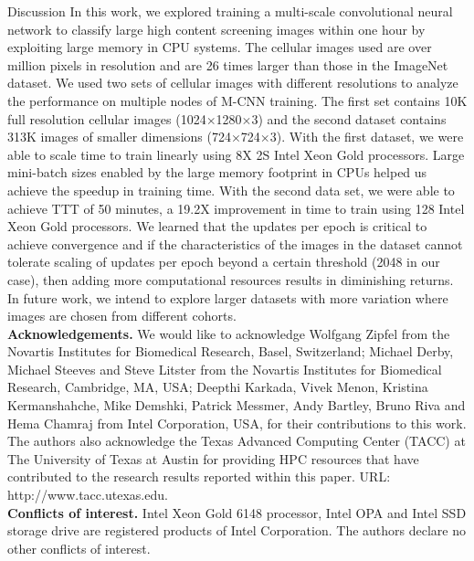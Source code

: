 \begin{section}{Discussion} \label{sec:discussion}
	\noindent  In this work, we explored training a multi-scale convolutional neural network to classify large high content screening images within one hour by exploiting large memory in CPU systems. The cellular images used are over million pixels in resolution and are 26 times larger than those in the ImageNet dataset. We used two sets of cellular images with different resolutions to analyze the performance on multiple nodes of M-CNN training. The first set contains 10K full resolution cellular images (1024$\times$1280$\times$3) and the second dataset contains 313K images of smaller dimensions (724$\times$724$\times$3). With the first dataset, we were able to scale time to train linearly using 8X 2S Intel\textregistered{} Xeon\textregistered{} Gold processors. Large mini-batch sizes enabled by the large memory footprint in CPUs helped us achieve the speedup in training time. With the second data set, we were able to achieve TTT of 50 minutes, a 19.2X improvement in time to train using 128 Intel\textregistered{} Xeon\textregistered{} Gold processors. We learned that the updates per epoch is critical to achieve convergence and if the characteristics of the images in the dataset cannot tolerate scaling of updates per epoch beyond a certain threshold (2048 in our case), then adding more computational resources results in diminishing returns. In future work, we intend to explore larger datasets with more variation where images are chosen from different cohorts. \\

  \noindent \textbf{Acknowledgements.} We would like to acknowledge Wolfgang Zipfel from the Novartis Institutes for Biomedical Research, Basel, Switzerland; Michael Derby, Michael Steeves and Steve Litster from the Novartis Institutes for Biomedical Research, Cambridge, MA, USA; Deepthi Karkada, Vivek Menon, Kristina Kermanshahche, Mike Demshki, Patrick Messmer, Andy Bartley, Bruno Riva and Hema Chamraj from Intel Corporation, USA, for their contributions to this work. The authors also acknowledge the Texas Advanced Computing Center (TACC) at The University of Texas at Austin for providing HPC resources that have contributed to the research results reported within this paper. URL: http://www.tacc.utexas.edu. \\

  \noindent
	\textbf{Conflicts of interest.} Intel\textregistered{} Xeon\textregistered{} Gold 6148 processor, Intel\textregistered{} OPA and Intel\textregistered{} SSD storage drive are registered products of Intel Corporation. The authors declare no other conflicts of interest.

\end{section}
